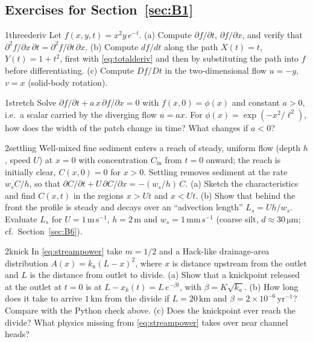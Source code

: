 \documentclass[11pt,letterpaper]{article}
\numberwithin{equation}{section}
\newcommand{\units}[1]{\,\mathrm{#1}}
\begin{document}
\subsection*{Exercises for Section~\ref{sec:B1}}

\begin{exercise}{1}{threederiv}
Let $f(x,y,t)=x^2y\,e^{-t}$.
(a) Compute $\partial f/\partial t$, $\partial f/\partial x$, and verify that $\partial^2f/\partial x\,\partial t=\partial^2 f/\partial t\,\partial x$.
(b) Compute $df/dt$ along the path $X(t)=t$, $Y(t)=1+t^2$, first with \eqref{eq:totalderiv} and then by
substituting the path into $f$ before differentiating.
(c) Compute $Df/Dt$ in the two-dimensional flow $u=-y$, $v=x$ (solid-body rotation).
\end{exercise}

\begin{exercise}{1}{stretch}
Solve $\partial f/\partial t+a\,x\,\partial f/\partial x=0$ with $f(x,0)=\phi(x)$ and constant $a>0$, i.e.\ a scalar
carried by the diverging flow $u=ax$. For $\phi(x)=\exp(-x^2/\ell^2)$, how does the width of the patch change in
time? What changes if $a<0$?
\end{exercise}

\begin{exercise}{2}{settling}
Well-mixed fine sediment enters a reach of steady, uniform flow (depth $h$, speed $U$) at $x=0$ with
concentration $C_{\mathrm{in}}$ from $t=0$ onward; the reach is initially clear, $C(x,0)=0$ for $x>0$. Settling removes
sediment at the rate $w_sC/h$, so that $\partial C/\partial t+U\,\partial C/\partial x=-(w_s/h)\,C$.
(a) Sketch the characteristics and find $C(x,t)$ in the regions $x>Ut$ and $x<Ut$.
(b) Show that behind the front the profile is steady and decays over an ``advection length''
$L_s=Uh/w_s$. Evaluate $L_s$ for $U=1\units{m\,s^{-1}}$, $h=2\units{m}$ and $w_s=1\units{mm\,s^{-1}}$
(coarse silt, $d\approx30\units{\mu m}$; cf.\ Section~\ref{sec:B6}).
\end{exercise}

\begin{exercise}{2}{knick}
In \eqref{eq:streampower} take $m=1/2$ and a Hack-like drainage-area distribution $A(x)=k_a(L-x)^2$, where $x$ is
distance upstream from the outlet and $L$ is the distance from outlet to divide.
(a) Show that a knickpoint released at the outlet at $t=0$ is at $L-x_k(t)=L\,e^{-\beta t}$, with $\beta=K\sqrt{k_a}$.
(b) How long does it take to arrive $1\units{km}$ from the divide if $L=20\units{km}$ and $\beta=2\times10^{-6}\units{yr^{-1}}$?
Compare with the Python check above.
(c) Does the knickpoint ever reach the divide? What physics missing from \eqref{eq:streampower} takes over near
channel heads?
\end{exercise}
\end{document}
